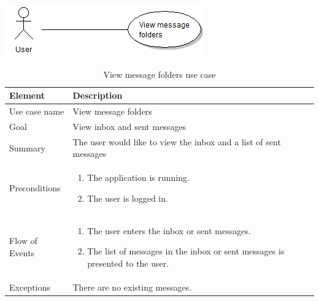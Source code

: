 \begin{table}
\begin{center}
\begin{center}
\includegraphics[width=\textwidth]{view_message_folders}
\end{center}
\begin{tabular}{p{3cm}|p{12cm}} \hline
\textbf{Element} & \textbf{Description} \\ \hline \hline
Use case name & View message folders \\ \hline
Goal & View inbox and sent messages \\ \hline
Summary &The user would like to view the inbox and a list of sent messages \\ \hline
Preconditions &
\begin{enumerate}
\item{}The application is running.
\item{}The user is logged in.
\end{enumerate} \\ \hline
Flow of Events &
\begin{enumerate}
\item{}The user enters the inbox or sent messages.
\item{}The list of messages in the inbox or sent messages is presented to the user.
\end{enumerate} \\ \hline
Exceptions & There are no existing messages.\\ \hline
\end{tabular}
\end{center}
\caption{View message folders use case} \label{tab:viewmessagefolders}
\end{table}

